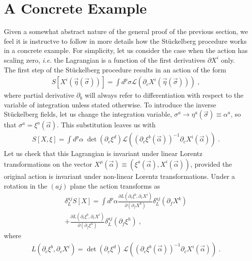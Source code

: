 \documentclass[%
 reprint,
 amsmath,amssymb,
 aps,
]{revtex4-1}
\begin{document}
\section{A Concrete Example}
Given a somewhat abstract nature of the general proof of the previous section, we feel it is instructve to follow in more details
 how the St\"uckelberg procedure works in a concrete example. For simplicity, let us consider the case when the action has scaling zero,
 {\it i.e.} the Lagrangian is a function of the first derivatives $\partial X^i$ only. The first step of the St\"uckelberg procedure results in an action of the form
\begin{eqnarray}
     S[X^i(\vec{\eta}(\vec{\sigma}))] = \int d^p \sigma \mathcal{L}
     (\partial_c X^i (\vec{\eta}(\vec{\sigma}))) \; , \nonumber
\end{eqnarray}
where partial derivative $\partial_b$ will always refer to differentiation with respect to the variable of integration
unless stated otherwise.  To introduce the inverse St\"uckelberg fields, let us change the integration variable,
 $\sigma^a \rightarrow \eta^a(\vec{\sigma}) \equiv \alpha^a$, so that
$\sigma^a = \xi^a(\vec{\alpha})$. This substitution leaves us with
\begin{eqnarray}
  S[X,\xi]  = \int d^p \alpha\;
   \mathrm{\det}\left({\partial_e \xi^d} \right)
    \mathcal{L}\left( \left({\partial_c \xi^b(\vec{\alpha})} \right)^{-1}
   {\partial_c X^i(\vec{\alpha})} \right)
     \; . \nonumber
\end{eqnarray}
Let us check that this Lagrangian is invariant under linear Lorentz
transformations on the vector $X^{\mu}(\vec{\alpha}) \equiv (\xi^a(\vec{\alpha}), X^i(\vec{\alpha}))$, provided the original  action is invariant
under non-linear Lorentz transformations.
 Under  a rotation
in the $(aj)$ plane the action transforms as
\begin{gather}
\label{Lvariation}
    \delta^{a j}_{L}S[X] =
    \int d^p \alpha \frac{\partial L(\partial_c \xi^b, \partial_c X^i)}{\partial(\partial_f X^k)}
    \delta^{a j}_{L} (\partial_f X^k)  \\
    + \frac{\partial L(\partial_c \xi^b, \partial_c X^i)}{\partial(\partial_f \xi^h)}
    \delta^{a j}_{L} (\partial_f \xi^h) \nonumber\;,
\end{gather}
where
\begin{eqnarray}
    L(\partial_c \xi^b, \partial_c X^i) = \mathrm{\det}( \partial_e \xi^d )
    \, \mathcal{L}( ( \partial_c \xi^b(\vec{\alpha}) )^{-1}
    \partial_c X^i(\vec{\alpha}) )\;.  \nonumber
\end{eqnarray}
\end{document}
